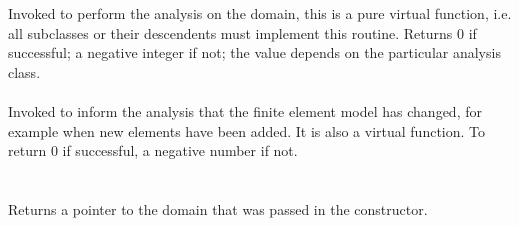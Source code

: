 \\
 \\
Invoked to perform the analysis on the domain, this is a pure virtual
function, i.e. all subclasses or their descendents must implement this
routine. Returns 0 if successful; a negative integer if not; the value
depends on the particular analysis class. \\

 \\
Invoked to inform the analysis that the finite element model has
changed, for example when new elements have been added. It is also a
virtual function. To return $0$ if successful, a negative number if
not.\\ 

\\
 \\
Returns a pointer to the domain that was passed in the constructor. \\




